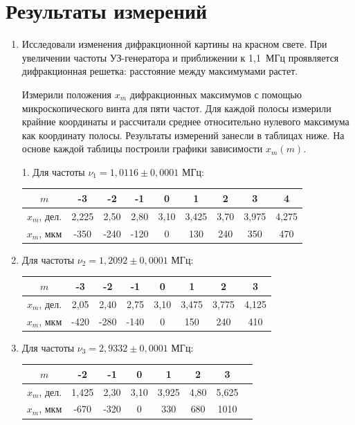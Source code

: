 \documentclass[a4paper,12pt]{article}
\begin{document}
	\section*{Результаты измерений}
	\begin{enumerate}
	    \item Исследовали изменения дифракционной картины на красном свете. При увеличении частоты УЗ-генератора и приближении к 1,1~МГц проявляется дифракционная решетка: расстояние между максимумами растет.
	    
	    Измерили положения $ x_m $ дифракционных максимумов с помощью микроскопического винта для пяти частот. Для каждой полосы измерили крайние координаты и рассчитали среднее относительно нулевого максимума как координату полосы. Результаты измерений занесли в таблицах ниже. На основе каждой таблицы построили графики зависимости $ x_m (m) $.
	    
	    1. Для частоты $\nu_1=1{,}0116\pm 0{,}0001$ МГц:
	    \begin{center}
	    \begin{tabular}{|c|c|c|c|c|c|c|c|c|}
            \hline
            $m$ & -3 & -2 & -1 & 0 & 1 & 2 & 3 & 4 \\ \hline
            $x_m$, дел. & 2,225 & 2,50 & 2,80 & 3,10 & 3,425 & 3,70 & 3,975 & 4,275 \\ \hline
            $x_m$, мкм & -350 & -240 & -120 & 0 & 130 & 240 & 350 & 470 \\ \hline
        \end{tabular}
	    \end{center}
	\item Для частоты $\nu_2=1{,}2092\pm 0{,}0001$ МГц:
	    \begin{center}
	    \begin{tabular}{|c|c|c|c|c|c|c|c|}
            \hline
            $m$ & -3 & -2 & -1 & 0 & 1 & 2 & 3 \\ \hline
            $x_m$, дел. & 2,05 & 2,40 & 2,75 & 3,10 & 3,475 & 3,775 & 4,125 \\ \hline
            $x_m$, мкм & -420 & -280 & -140 & 0 & 150 & 240 & 410 \\ \hline
        \end{tabular}
	    \end{center}
	    

	
	\item Для частоты $\nu_3=2{,}9332\pm 0{,}0001$ МГц:
	    \begin{center}
	    \begin{tabular}{|c|c|c|c|c|c|c|c|}
            \hline
            $m$ & -2 & -1 & 0 & 1 & 2 & 3 \\ \hline
            $x_m$, дел. & 1,425 & 2,30 & 3,10 & 3,925 & 4,80 & 5,625 \\ \hline
            $x_m$, мкм & -670 & -320 & 0 & 330 & 680 & 1010 \\ \hline
        \end{tabular}
	    \end{center}


\end{enumerate}
\end{document}
